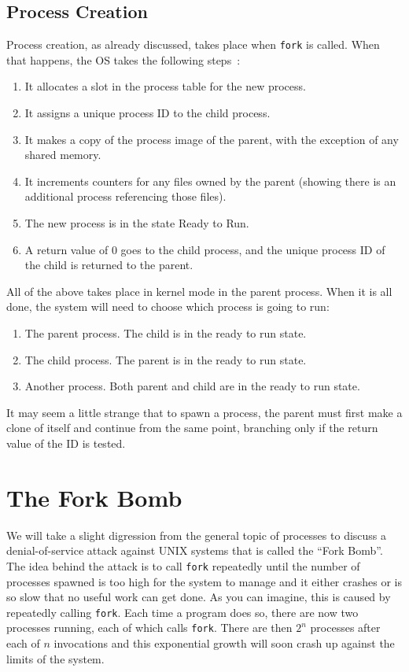 \subsection*{Process Creation}
Process creation, as already discussed, takes place when \texttt{fork} is called. When that happens, the OS takes the following steps~\cite{bach86}:

\begin{enumerate}
	\item It allocates a slot in the process table for the new process.
	\item It assigns a unique process ID to the child process.
	\item It makes a copy of the process image of the parent, with the exception of any shared memory.
	\item It increments counters for any files owned by the parent (showing there is an additional process referencing those files).
	\item The new process is in the state Ready to Run.
	\item A return value of 0 goes to the child process, and the unique process ID of the child is returned to the parent.
\end{enumerate}

All of the above takes place in kernel mode in the parent process. When it is all done, the system will need to choose which process is going to run: 

\begin{enumerate}
	\item The parent process. The child is in the ready to run state.
	\item The child process. The parent is in the ready to run state.
	\item Another process. Both parent and child are in the ready to run state.
\end{enumerate}

It may seem a little strange that to spawn a process, the parent must first make a clone of itself and continue from the same point, branching only if the return value of the ID is tested.

\section*{The Fork Bomb}

We will take a slight digression from the general topic of processes to discuss a denial-of-service attack against UNIX systems that is called the ``Fork Bomb''. The idea behind the attack is to call \texttt{fork} repeatedly until the number of processes spawned is too high for the system to manage and it either crashes or is so slow that no useful work can get done. As you can imagine, this is caused by repeatedly calling \texttt{fork}. Each time a program does so, there are now two processes running, each of which calls \texttt{fork}. There are then $2^{n}$ processes after each of $n$ invocations and this exponential growth will soon crash up against the limits of the system.

